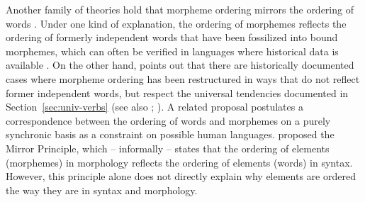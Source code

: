 \documentclass[11pt,letterpaper]{article}
\newcommand{\citep}{\parencite}
\newcommand{\citet}{\Textcite}
\newcommand\mhahn[1]{{\color{red}(#1)}}
\begin{document}









Another family of theories hold that morpheme ordering mirrors the ordering of words \citep{givon1971historical,venneman1973explanation,baker1985the}.
Under one kind of explanation, the ordering of morphemes reflects the ordering of formerly independent words that have been fossilized into bound morphemes, which can often be verified in languages where historical data is available \citep{givon1971historical,venneman1973explanation}.
On the other hand, \citet{bybee-morphology-1985} points out that there are historically documented cases where morpheme ordering has been restructured in ways that do not reflect former independent words, but respect the universal tendencies documented in Section~\ref{sec:univ-verbs} (see also \citet{mithun2000the, haspelmath1993the, mithun1995affixation}; \citet[Section 15]{rice2000morpheme}).
A related proposal postulates a correspondence between the ordering of words and morphemes on a purely synchronic basis as a constraint on possible human languages.
\citet{baker1985the} proposed the Mirror Principle, which -- informally -- states that the ordering of elements (morphemes) in morphology reflects the ordering of elements (words) in syntax.
However, this principle alone does not directly explain why elements are ordered the way they are in syntax and morphology.
\end{document}
